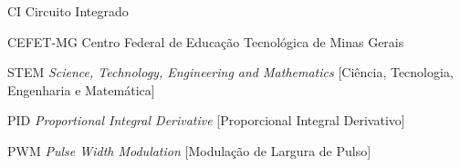 \begin{siglas}
  \item[CI] Circuito Integrado
  \item[CEFET-MG] Centro Federal de Educação Tecnológica de Minas Gerais
  \item[STEM] \textit{Science, Technology, Engineering and Mathematics} [Ciência, Tecnologia, Engenharia e Matemática]
  \item[PID] \textit{Proportional Integral Derivative} [Proporcional Integral Derivativo]
  \item[PWM] \textit{Pulse Width Modulation} [Modulação de Largura de Pulso]  
\end{siglas}


\tableofcontents*
\cleardoublepage
